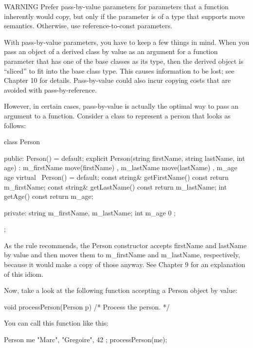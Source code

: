 \begin{myWarning}{WARNING}
Prefer pass-by-value parameters for parameters that a function inherently would copy, but only if the parameter is of a type that supports move semantics. Otherwise, use reference-to-const parameters.
\end{myWarning}

With pass-by-value parameters, you have to keep a few things in mind. When you pass an object of a derived class by value as an argument for a function parameter that has one of the base classes as its type, then the derived object is “sliced” to fit into the base class type. This causes information to be lost; see Chapter 10 for details. Pass-by-value could also incur copying costs that are avoided with pass-by-reference.

However, in certain cases, pass-by-value is actually the optimal way to pass an argument to a function. Consider a class to represent a person that looks as follows:

\begin{cpp}
class Person
{
    public:
        Person() = default;
        explicit Person(string firstName, string lastName, int age)
            : m_firstName { move(firstName) }, m_lastName { move(lastName) }
            , m_age { age } { }
        virtual ~Person() = default;
        const string& getFirstName() const { return m_firstName; }
        const string& getLastName() const { return m_lastName; }
        int getAge() const { return m_age; }

    private:
        string m_firstName, m_lastName;
        int m_age { 0 };
};
\end{cpp}

As the rule recommends, the Person constructor accepts firstName and lastName by value and then moves them to m\_firstName and m\_lastName, respectively, because it would make a copy of those anyway. See Chapter 9 for an explanation of this idiom.

Now, take a look at the following function accepting a Person object by value:

\begin{cpp}
void processPerson(Person p) { /* Process the person. */ }
\end{cpp}

You can call this function like this:

\begin{cpp}
Person me { "Marc", "Gregoire", 42 };
processPerson(me);
\end{cpp}

